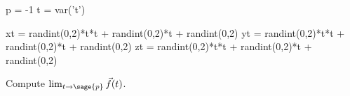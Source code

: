 \documentclass{ximera}
\author{Jim Fowler}
\begin{document}
\begin{sagesilent}
  p = -1
  t = var('t')
  
  xt = randint(0,2)*t*t + randint(0,2)*t + randint(0,2)
  yt = randint(0,2)*t*t + randint(0,2)*t + randint(0,2)
  zt = randint(0,2)*t*t + randint(0,2)*t + randint(0,2)
\end{sagesilent}

\begin{exercise}

  Compute $\lim_{t \to \sage{p}} \vec{f}(t)$.


  
\end{exercise}
\end{document}
